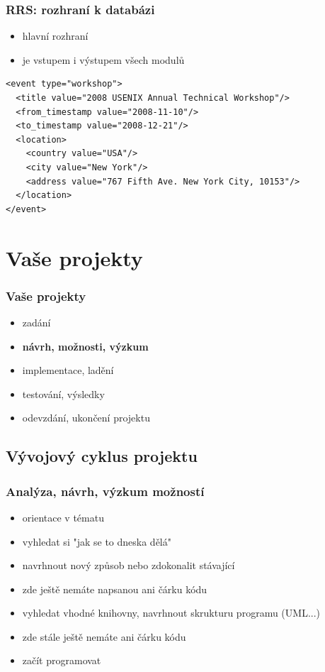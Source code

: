 \documentclass{beamer}
\begin{document}
\begin{frame}[containsverbatim]
  \frametitle{RRS: rozhraní k databázi}
  \begin{itemize}
    \item hlavní rozhraní
    \item je vstupem i výstupem všech modulů
  \end{itemize}
  \begingroup
  \fontsize{9pt}{11pt}\selectfont
  \begin{verbatim}
<event type="workshop">
  <title value="2008 USENIX Annual Technical Workshop"/>
  <from_timestamp value="2008-11-10"/>
  <to_timestamp value="2008-12-21"/>
  <location>
    <country value="USA"/>
    <city value="New York"/>
    <address value="767 Fifth Ave. New York City, 10153"/>
  </location>
</event>
  \end{verbatim}
  \endgroup
\end{frame}



\section {Va\v{s}e projekty}

\begin{frame}
  \frametitle{Vaše projekty}
  \begin{itemize}
    \item zadání
    \item \alert{\textbf{návrh, možnosti, výzkum}}
    \item implementace, ladění
    \item testování, výsledky
    \item odevzdání, ukončení projektu
  \end{itemize}
\end{frame}

\subsection{Vývojový cyklus projektu}
\begin{frame}
  \frametitle{Analýza, návrh, výzkum možností}
  \begin{itemize}
    \item orientace v tématu
    \item vyhledat si "jak se to dneska dělá"
    \item navrhnout nový způsob nebo zdokonalit stávající
    \item \alert{zde ještě nemáte napsanou ani čárku kódu}
    \item vyhledat vhodné knihovny, navrhnout skrukturu programu (UML...)
    \item \alert{zde stále ještě nemáte ani čárku kódu}
    \item začít programovat
  \end{itemize}
\end{frame}
\end{document}
